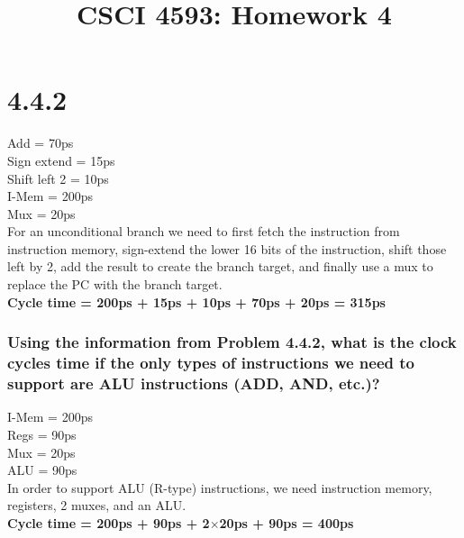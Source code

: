 \documentclass[12pt]{article}
\begin{document}
	
\title{CSCI 4593: Homework 4}
\author{}
\date{}

\maketitle

\section*{4.4.2}
Add = 70ps\\
Sign extend = 15ps\\
Shift left 2 = 10ps\\
I-Mem = 200ps\\
Mux = 20ps\\
For an unconditional branch we need to first fetch the instruction from instruction memory, sign-extend the lower 16 bits of the instruction,
shift those left by 2, add the result to create the branch target, and finally use a mux to replace the PC with the branch target.\\
\textbf{Cycle time = 200ps + 15ps + 10ps + 70ps + 20ps = 315ps}\\
\subsubsection*{Using the information from Problem 4.4.2, what is the clock cycles time if the only types of instructions we need to support are ALU instructions (ADD, AND, etc.)?}
I-Mem = 200ps\\
Regs = 90ps\\
Mux = 20ps\\
ALU = 90ps\\
In order to support ALU (R-type) instructions, we need instruction memory, registers, 2 muxes, and an ALU.\\
\textbf{Cycle time = 200ps + 90ps + 2}$\mathbf{\times}$\textbf{20ps + 90ps = 400ps}\\
\end{document}
